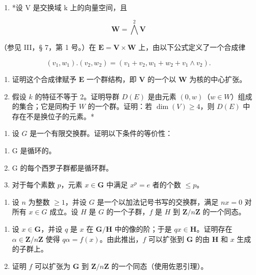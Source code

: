 \begin{enumerate}
\def\labelenumi{\arabic{enumi}。}
\setcounter{enumi}{15}
\tightlist
\item
  *设 V 是交换域 k 上的向量空间，且
\end{enumerate}

\[
\mathbf {W} = \bigwedge^ {2} \mathbf {V}
\]

（参见 III，§ 7，第 1 号。）在 \(\mathbf{E} = \mathbf{V} \times \mathbf{W}\) 上，由以下公式定义了一个合成律

\[
(v _ {1}, w _ {1}). (v _ {2}, w _ {2}) = (v _ {1} + v _ {2}, w _ {1} + w _ {2} + v _ {1} \wedge v _ {2}).
\]

\begin{enumerate}
\def\labelenumi{(\alph{enumi})}
\item
  证明这个合成律赋予 \(\mathbf{E}\) 一个群结构，即 \(\mathbf{V}\) 的一个以 \(\mathbf{W}\) 为核的中心扩张。
\item
  假设 \(k\) 的特征不等于 2。证明导群 \(D(E)\) 是由元素 \((0, w)\)（\(w \in W\)）组成的集合；它是同构于 \(W\) 的一个群。证明：若 \(\dim(V) \geqslant 4\)，则 \(D(E)\) 中存在不是换位子的元素。*
\end{enumerate}

\begin{enumerate}
\def\labelenumi{\arabic{enumi}。}
\setcounter{enumi}{16}
\tightlist
\item
  设 \(G\) 是一个有限交换群。证明以下条件的等价性：
\end{enumerate}

\begin{enumerate}
\def\labelenumi{(\alph{enumi})}
\item
  G 是循环的。
\item
  G 的每个西罗子群都是循环群。
\item
  对于每个素数 \(p\)，元素 \(x \in \mathbf{G}\) 中满足 \(x^p = e\) 者的个数 \(\leqslant p\)。
\end{enumerate}

\begin{enumerate}
\def\labelenumi{\arabic{enumi}。}
\setcounter{enumi}{17}
\tightlist
\item
  设 \(n\) 为整数 \(\geqslant 1\)，并设 \(G\) 是一个以加法记号书写的交换群，满足 \(nx = 0\) 对所有 \(x \in G\) 成立。设 \(H\) 是 \(G\) 的一个子群，\(f\) 是 \(H\) 到 \(\mathbf{Z} / n\mathbf{Z}\) 的一个同态。
\end{enumerate}

\begin{enumerate}
\def\labelenumi{(\alph{enumi})}
\item
  设 \(x \in \mathbf{G}\)，并设 \(q\) 是 \(x\) 在 \(\mathbf{G} / \mathbf{H}\) 中的像的阶；于是 \(qx \in \mathbf{H}\)。证明存在 \(\alpha \in \mathbf{Z} / n\mathbf{Z}\) 使得 \(q\alpha = f(x)\)。由此推出，\(f\) 可以扩张到 \(\mathbf{G}\) 的由 \(\mathbf{H}\) 和 \(x\) 生成的子群上。
\item
  证明 \(f\) 可以扩张为 \(\mathbf{G}\) 到 \(\mathbf{Z} / n\mathbf{Z}\) 的一个同态（使用佐恩引理）。
\end{enumerate}

